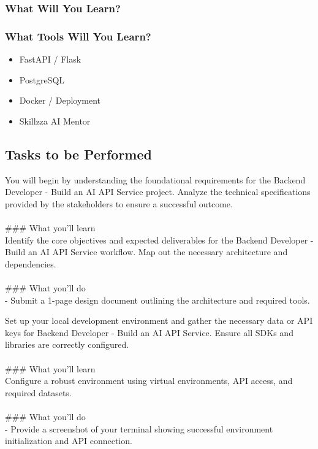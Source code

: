 \documentclass{article}
\begin{document}
\subsubsection*{What Will You Learn?}
\begin{itemize}
\end{itemize}

\subsubsection*{What Tools Will You Learn?}
\begin{itemize}
    \item FastAPI / Flask
    \item PostgreSQL
    \item Docker / Deployment
    \item Skillzza AI Mentor
\end{itemize}

\subsection*{Tasks to be Performed}
You will begin by understanding the foundational requirements for the Backend Developer - Build an AI API Service project. Analyze the technical specifications provided by the stakeholders to ensure a successful outcome. \\
 \\
### What you'll learn \\
Identify the core objectives and expected deliverables for the Backend Developer - Build an AI API Service workflow. Map out the necessary architecture and dependencies. \\
 \\
### What you'll do \\
- Submit a 1-page design document outlining the architecture and required tools.

Set up your local development environment and gather the necessary data or API keys for Backend Developer - Build an AI API Service. Ensure all SDKs and libraries are correctly configured. \\
 \\
### What you'll learn \\
Configure a robust environment using virtual environments, API access, and required datasets. \\
 \\
### What you'll do \\
- Provide a screenshot of your terminal showing successful environment initialization and API connection.
\end{document}
